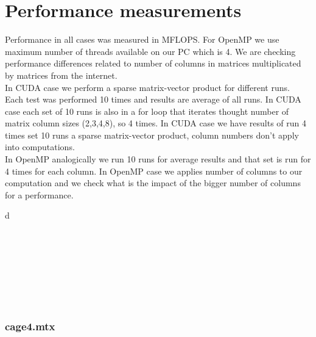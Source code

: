 \documentclass{scrreprt}
\begin{document}
\chapter{Performance measurements}

Performance in all cases was measured in MFLOPS. 
For OpenMP we use maximum number of threads available on our PC which is 4. We are checking performance differences related to number of columns in matrices multiplicated by matrices from the internet.
\\
In CUDA case we perform a sparse matrix-vector product for different runs.
\\
Each test was performed 10 times and results are average of all runs. In CUDA case each set of 10 runs is also in a for loop that iterates thought number of matrix column sizes (2,3,4,8), so 4 times. In CUDA case we have results of run 4 times set 10 runs a sparse matrix-vector product, column numbers don't apply into computations. 
\\
In OpenMP analogically we run 10 runs for average results and that set is run for 4 times for each column. In OpenMP case we applies number of columns to our computation and we check what is the impact of the bigger number of columns for a performance.

d
\\
\\
\\
\\
\\
\\
\\
\\




\subsection{cage4.mtx}
\end{document}
